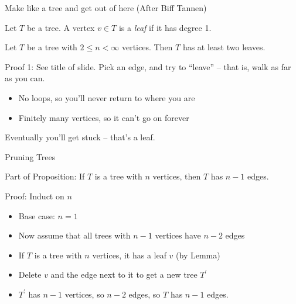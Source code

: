 \documentclass{beamer}
\begin{document}
\begin{frame}{Make like a tree and get out of here (After Biff Tannen)}

  \begin{definition}[Tree]Let $T$ be a tree.  A vertex $v\in T$ is a \emph{leaf} if it has degree 1.\end{definition}
\begin{lemma}Let $T$ be a tree with $2\leq n<\infty$ vertices.  Then $T$ has at least two leaves. \end{lemma}

\begin{block}{Proof 1: See title of slide.}
Pick an edge, and try to ``leave'' -- that is, walk as far as you can.
  \begin{itemize}
  \item No loops, so you'll never return to where you are
  \item Finitely many vertices, so it can't go on forever
  \end{itemize}
Eventually you'll get stuck -- that's a leaf.
\end{block}
\end{frame}
\begin{frame}{Pruning Trees}
  \begin{block}{Part of Proposition:} If $T$ is a tree with $n$ vertices, then $T$ has $n-1$ edges.
  \end{block}
  \begin{block}{Proof: Induct on $n$}
    \begin{itemize} \item Base case: $n=1$
      \item Now assume that all trees with $n-1$ vertices have $n-2$ edges
      \item If $T$ is a tree with $n$ vertices, it has a leaf $v$ (by Lemma)
        \item Delete $v$ and the edge next to it to get a new tree $T^\prime$ 
        \item $T^\prime$ has $n-1$ vertices, so $n-2$ edges, so $T$ has $n-1$ edges.
          \end{itemize}
    \end{block}
\end{frame}
\end{document}
